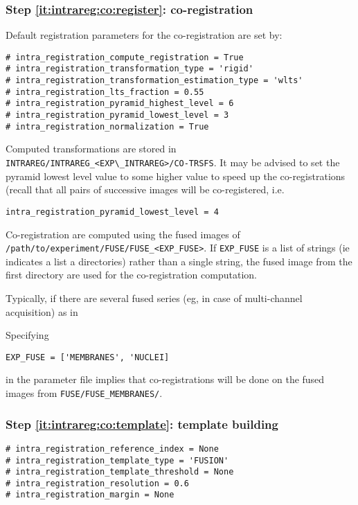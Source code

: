 \subsubsection{Step \ref{it:intrareg:co:register}: co-registration}
\label{sec:cli:intraregistration:coregistration}
Default registration parameters for the co-registration are set by:
\begin{verbatim}
# intra_registration_compute_registration = True
# intra_registration_transformation_type = 'rigid'
# intra_registration_transformation_estimation_type = 'wlts'
# intra_registration_lts_fraction = 0.55
# intra_registration_pyramid_highest_level = 6
# intra_registration_pyramid_lowest_level = 3
# intra_registration_normalization = True
\end{verbatim}
Computed transformations are stored in \verb|INTRAREG/INTRAREG_<EXP\_INTRAREG>/CO-TRSFS|.
It may be advised to set the pyramid lowest level value to some higher value to speed up the co-registrations (recall that all pairs of successive images will be co-registered, i.e.
\begin{verbatim}
intra_registration_pyramid_lowest_level = 4
\end{verbatim}

Co-registration are computed using the fused images of
\texttt{/path/to/experiment/FUSE/FUSE\_<EXP\_FUSE>}. If
\texttt{EXP\_FUSE} is a list of strings (ie indicates a list a
directories) rather than a single string, the fused image from the
first directory are used for the co-registration computation.

Typically, if there are several fused series (eg, in case of multi-channel
acquisition) as in

\mbox{}
\mbox{}

Specifying
\begin{verbatim}
EXP_FUSE = ['MEMBRANES', 'NUCLEI]
\end{verbatim}
in the parameter file implies that co-registrations will be done on
the fused images from \texttt{FUSE/FUSE\_MEMBRANES/}.



\subsubsection{Step \ref{it:intrareg:co:template}: template building}
\label{sec:cli:intraregistration:template}

\begin{verbatim}
# intra_registration_reference_index = None
# intra_registration_template_type = 'FUSION'
# intra_registration_template_threshold = None
# intra_registration_resolution = 0.6
# intra_registration_margin = None
\end{verbatim}


